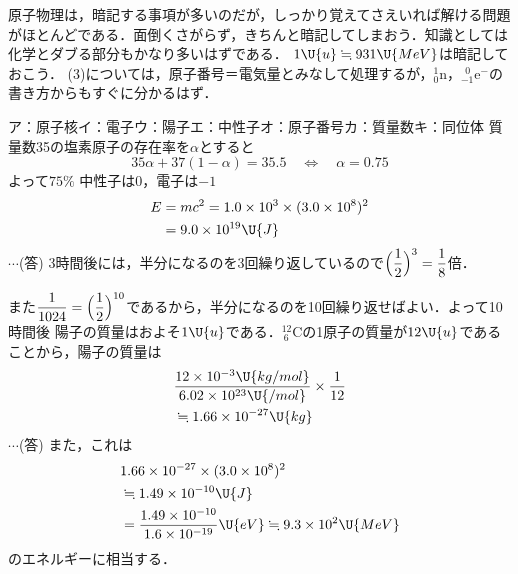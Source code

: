 \setlength{\columnseprule}{0.4pt}
\begin{multicols}{2}
\raggedcolumns

\par\nopagebreak
\begin{sisin}
原子物理は，暗記する事項が多いのだが，しっかり覚えてさえいれば解ける問題がほとんどである．面倒くさがらず，きちんと暗記してしまおう．知識としては化学とダブる部分もかなり多いはずである．
$1\U{u}\fallingdotseq 931\U{MeV}$は暗記しておこう．
(3)については，原子番号＝電気量とみなして処理するが，${}^1_0\mathrm{n}$，${}^{\ \ 0}_{-1}\mathrm{e}^-$の書き方からもすぐに分かるはず．
\end{sisin}
\KaiHead
\begin{komon}
 ア：原子核\quad イ：電子\quad ウ：陽子\quad エ：中性子\quad オ：原子番号\quad カ：質量数\quad キ：同位体\Ans
{} 質量数35の塩素原子の存在率を$\alpha$とすると
       \[35\alpha+37(1-\alpha)=35.5\quad\Leftrightarrow\quad\alpha=0.75\]
       よって\quad $75\%$\Ans
{} 中性子は$0$，電子は$-1$\Ans
{} \[\begin{aligned}E&=mc^2=1.0\times 10^3\times(3.0\times 10^8)^2\\&=9.0\times 10^{19}\U{J}\end{aligned}\]
       \hspace*{\fill}$\cdots$(答)
 3時間後には，半分になるのを3回繰り返しているので$\Bigl(\dfrac{1}{2}\Bigr)^3=\dfrac{1}{8}$倍．\Ans\par
       また$\dfrac{1}{1024}=\Bigl(\dfrac{1}{2}\Bigr)^{10}$であるから，半分になるのを10回繰り返せばよい．よって\quad 10時間後\Ans
{} 陽子の質量はおよそ$1\U{u}$である．${}^{12}_{\ 6}\mathrm{C}$の1原子の質量が$12\U{u}$であることから，陽子の質量は
       \[\begin{aligned}&\frac{12\times 10^{-3}\U{kg/mol}}{6.02\times 10^{23}\U{/mol}}\times\frac{1}{12}\\&\fallingdotseq 1.66\times 10^{-27}\U{kg}\end{aligned}\]
       \hspace*{\fill}$\cdots$(答)
       また，これは
       \[\begin{aligned}&1.66\times 10^{-27}\times(3.0\times 10^8)^2\\&\fallingdotseq 1.49\times 10^{-10}\U{J}\\&=\frac{1.49\times 10^{-10}}{1.6\times 10^{-19}}\U{eV}\fallingdotseq 9.3\times 10^2\U{MeV}\end{aligned}\]
       のエネルギーに相当する．\Ans
\end{komon}


\end{multicols}
